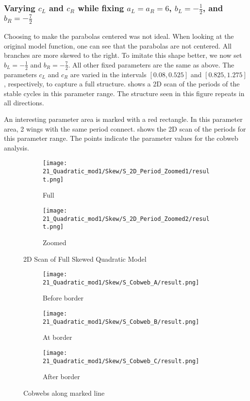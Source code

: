 \subsubsection{Varying $c_L$ and $c_R$ while fixing $a_L = a_R = 6$, $b_L = -\frac{1}{2}$, and $b_R = -\frac{7}{2}$}

Choosing to make the parabolas centered was not ideal.
When looking at the original model function, one can see that the parabolas are not centered.
All branches are more skewed to the right.
To imitate this shape better, we now set $b_L = -\frac{1}{2}$ and $b_R = -\frac{7}{2}$.
All other fixed parameters are the same as above.
The parameters $c_L$ and $c_R$ are varied in the intervals $[0.08, 0.525]$ and $[0.825, 1.275]$, respectively, to capture a full structure.
 shows a 2D scan of the periods of the stable cycles in this parameter range.
The structure seen in this figure repeats in all directions.

An interesting parameter area is marked with a red rectangle.
In this parameter area, 2 wings with the same period connect.
 shows the 2D scan of the periods for this parameter range.
The points indicate the parameter values for the cobweb analysis.

\begin{figure}
	\centering
	\begin{subfigure}{0.4\textwidth}
		\centering
		\texttt{[image: 21\_Quadratic\_mod1/Skew/S\_2D\_Period\_Zoomed1/result.png]}
		\caption{Full}
		\label{fig:setup.quad.skew.period.full}
	\end{subfigure}
	\begin{subfigure}{0.4\textwidth}
		\texttt{[image: 21\_Quadratic\_mod1/Skew/S\_2D\_Period\_Zoomed2/result.png]}
		\caption{Zoomed}
		\label{fig:setup.quad.skew.period.zoomed}
	\end{subfigure}
	\caption{2D Scan of Full Skewed Quadratic Model}
	\label{fig:setup.quad.skew.period}
\end{figure}

\begin{figure}
	\centering
	\begin{subfigure}{0.3\textwidth}
		\centering
		\texttt{[image: 21\_Quadratic\_mod1/Skew/S\_Cobweb\_A/result.png]}
		\caption{Before border}
		\label{fig:setup.quad.skew.cobweb.A}
	\end{subfigure}
	\begin{subfigure}{0.3\textwidth}
		\centering
		\texttt{[image: 21\_Quadratic\_mod1/Skew/S\_Cobweb\_B/result.png]}
		\caption{At border}
		\label{fig:setup.quad.skew.cobweb.B}
	\end{subfigure}
	\begin{subfigure}{0.3\textwidth}
		\centering
		\texttt{[image: 21\_Quadratic\_mod1/Skew/S\_Cobweb\_C/result.png]}
		\caption{After border}
		\label{fig:setup.quad.skew.cobweb.C}
	\end{subfigure}
	\caption{Cobwebs along marked line}
	\label{fig:setup.quad.skew.cobwebs}
\end{figure}

